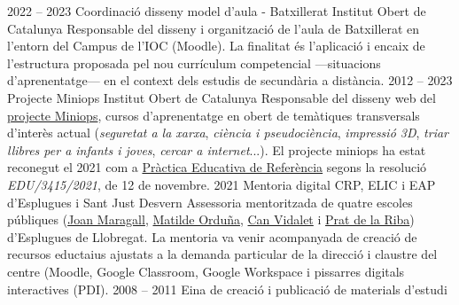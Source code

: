 \documentclass[9pt]{developercv} %
\begin{document}
\vspace{0.5cm}
\begin{center}
\end{center}



\begin{entrylist}
  \entry
	  {2022 -- 2023}
	  {Coordinació disseny model d'aula - Batxillerat}
	  {Institut Obert de Catalunya}
	  {Responsable del disseny i organització de l'aula de Batxillerat en l'entorn del Campus de l'IOC (Moodle). La finalitat és l'aplicació i encaix de l'estructura proposada pel nou currículum competencial ---situacions d'aprenentatge--- en el context dels estudis de secundària a distància.}
  \entry
	  {2012 -- 2023}
	  {Projecte Miniops}
	  {Institut Obert de Catalunya}
      {Responsable del disseny web del \href{https://miniops.ioc.cat/}{projecte Miniops}, cursos d'aprenentatge en obert de temàtiques transversals d'interès actual (\emph{seguretat a la xarxa}, \emph{ciència i pseudociència}, \emph{impressió 3D}, \emph{triar llibres per a infants i joves}, \emph{cercar a internet}...). El projecte miniops ha estat reconegut el 2021 com a \href{https://documents.espai.educacio.gencat.cat/IPCNormativa/DisposicionsInternes/20220302-llista-definitiva-practiques-referencia.pdf}{Pràctica Educativa de Referència} segons la resolució \emph{EDU/3415/2021}, de 12 de novembre.}
  \entry
      {2021}
      {Mentoria digital}
      {CRP, ELIC i EAP d'Esplugues i Sant Just Desvern}
      {Assessoria mentoritzada de quatre escoles públiques (\href{https://slides.com/xavierbelanchealonso/joan-maragall/}{Joan Maragall}, \href{https://slides.com/xavierbelanchealonso/matilde-ordua/}{Matilde Orduña}, \href{https://slides.com/xavierbelanchealonso/can-vidalet/}{Can Vidalet} i \href{https://slides.com/xavierbelanchealonso/assessoria-mentoritzada-escola-prat-de-la-riba}{Prat de la Riba}) d'Esplugues de Llobregat. La mentoria va venir acompanyada de creació de recursos eductaius ajustats a la demanda particular de la direcció i claustre del centre (Moodle, Google Classroom, Google Workspace i pissarres digitals interactives (PDI). }
  \entry
      {2008 -- 2011}
      {Eina de creació i publicació de materials d'estudi}

\end{entrylist}
\end{document}
